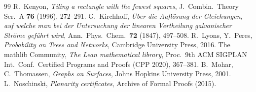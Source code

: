 \documentclass[11pt]{amsart}
\theoremstyle{plain}
\theoremstyle{definition}
\theoremstyle{remark}
\begin{document}
\begin{thebibliography}{99}
 R.~Kenyon, \emph{Tiling a rectangle with the fewest squares}, J.\ Combin.\ Theory Ser.\ A
  \textbf{76} (1996), 272--291.
 G.~Kirchhoff, \emph{\"Uber die Aufl\"osung der Gleichungen, auf welche man bei der
  Untersuchung der linearen Vertheilung galvanischer Str\"ome gef\"uhrt wird}, Ann.\ Phys.\ Chem.\ \textbf{72}
  (1847), 497--508.
 R.~Lyons, Y.~Peres, \emph{Probability on Trees and Networks}, Cambridge University Press,
  2016.
 The mathlib Community, \emph{The Lean mathematical library}, Proc.\ 9th ACM SIGPLAN Int.\ Conf.\
  Certified Programs and Proofs (CPP 2020), 367--381.
 B.~Mohar, C.~Thomassen, \emph{Graphs on Surfaces}, Johns Hopkins University Press, 2001.
\bibitem{NoschinskiAFP} L.~Noschinski, \emph{Planarity certificates}, Archive of Formal Proofs (2015).
\end{thebibliography}
\end{document}
